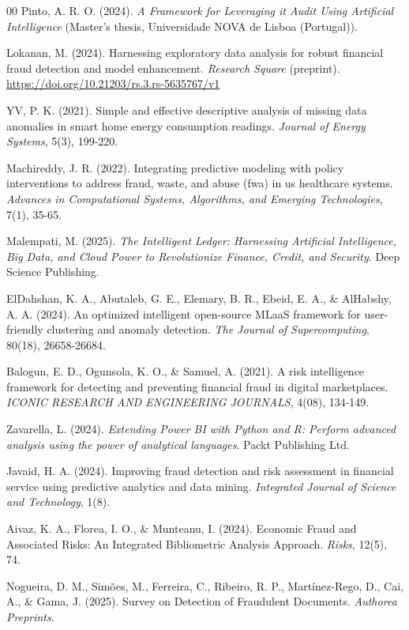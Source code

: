 \documentclass[conference]{IEEEtran}
\begin{document}
\begin{thebibliography}{00}
 Pinto, A. R. O. (2024). \emph{A Framework for Leveraging it Audit Using Artificial Intelligence} (Master's thesis, Universidade NOVA de Lisboa (Portugal)).

 Lokanan, M. (2024). Harnessing exploratory data analysis for robust financial fraud detection and model enhancement. \emph{Research Square} (preprint). \url{https://doi.org/10.21203/rs.3.rs-5635767/v1}

 YV, P. K. (2021). Simple and effective descriptive analysis of missing data anomalies in smart home energy consumption readings. \emph{Journal of Energy Systems}, 5(3), 199-220.

 Machireddy, J. R. (2022). Integrating predictive modeling with policy interventions to address fraud, waste, and abuse (fwa) in us healthcare systems. \emph{Advances in Computational Systems, Algorithms, and Emerging Technologies}, 7(1), 35-65.

 Malempati, M. (2025). \emph{The Intelligent Ledger: Harnessing Artificial Intelligence, Big Data, and Cloud Power to Revolutionize Finance, Credit, and Security}. Deep Science Publishing.

 ElDahshan, K. A., Abutaleb, G. E., Elemary, B. R., Ebeid, E. A., \& AlHabshy, A. A. (2024). An optimized intelligent open-source MLaaS framework for user-friendly clustering and anomaly detection. \emph{The Journal of Supercomputing}, 80(18), 26658-26684.

 Balogun, E. D., Ogunsola, K. O., \& Samuel, A. (2021). A risk intelligence framework for detecting and preventing financial fraud in digital marketplaces. \emph{ICONIC RESEARCH AND ENGINEERING JOURNALS}, 4(08), 134-149.

 Zavarella, L. (2024). \emph{Extending Power BI with Python and R: Perform advanced analysis using the power of analytical languages}. Packt Publishing Ltd.

 Javaid, H. A. (2024). Improving fraud detection and risk assessment in financial service using predictive analytics and data mining. \emph{Integrated Journal of Science and Technology}, 1(8).

 Aivaz, K. A., Florea, I. O., \& Munteanu, I. (2024). Economic Fraud and Associated Risks: An Integrated Bibliometric Analysis Approach. \emph{Risks}, 12(5), 74.

 Nogueira, D. M., Sim\~oes, M., Ferreira, C., Ribeiro, R. P., Mart\'inez-Rego, D., Cai, A., \& Gama, J. (2025). Survey on Detection of Fraudulent Documents. \emph{Authorea Preprints}.


\end{thebibliography}
\end{document}
